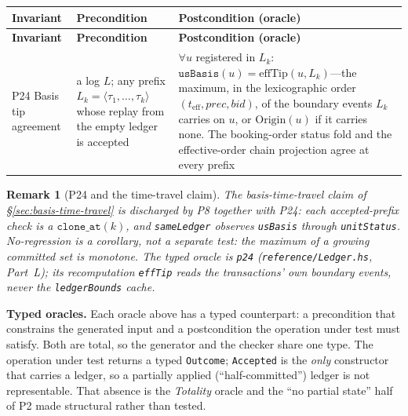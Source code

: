 \documentclass[11pt,a4paper]{article}
\newtheorem{remark}[definition]{Remark}
\begin{document}
\renewcommand{\arraystretch}{1.3}
\begin{center}
\begin{longtable}{@{}p{2.5cm} p{4.4cm} p{5.4cm}@{}}
\toprule
\textbf{Invariant} & \textbf{Precondition} & \textbf{Postcondition (oracle)} \\
\midrule
\endfirsthead
\toprule
\textbf{Invariant} & \textbf{Precondition} & \textbf{Postcondition (oracle)} \\
\midrule
\endhead

P24 Basis tip agreement & a log $L$; any prefix $L_k=\langle\tau_1,\dots,\tau_k\rangle$ whose replay from the empty ledger is accepted & $\forall u$ registered in $L_k$: $\texttt{usBasis}(u)=\mathrm{effTip}(u,L_k)$---the maximum, in the lexicographic order $(t_{\mathrm{eff}},\mathit{prec},\mathit{bid})$, of the boundary events $L_k$ carries on $u$, or $\mathrm{Origin}(u)$ if it carries none. The booking-order status fold and the effective-order chain projection agree at every prefix \\

\bottomrule
\end{longtable}
\end{center}
\renewcommand{\arraystretch}{1.0}

\begin{remark}[P24 and the time-travel claim]
The basis-time-travel claim of \S\ref{sec:basis-time-travel} is discharged by P8 together with P24: each accepted-prefix check is a $\texttt{clone\_at}(k)$, and \texttt{sameLedger} observes \texttt{usBasis} through \texttt{unitStatus}. No-regression is a corollary, not a separate test: the maximum of a growing committed set is monotone. The typed oracle is \texttt{p24} (\texttt{reference/Ledger.hs}, Part~L); its recomputation \texttt{effTip} reads the transactions' own boundary events, never the \texttt{ledgerBounds} cache.
\end{remark}

\medskip
\noindent\textbf{Typed oracles.} Each oracle above has a typed counterpart: a precondition that constrains the generated input and a postcondition the operation under test must satisfy. Both are total, so the generator and the checker share one type. The operation under test returns a typed \texttt{Outcome}; \texttt{Accepted} is the \emph{only} constructor that carries a ledger, so a partially applied (``half-committed'') ledger is not representable. That absence is the \emph{Totality} oracle and the ``no partial state'' half of P2 made structural rather than tested.
\end{document}
